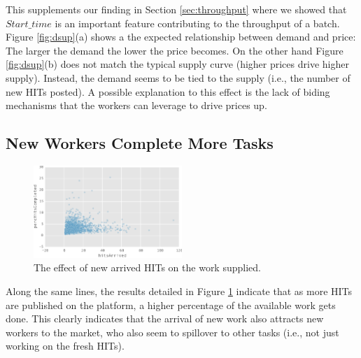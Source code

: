 This supplements our finding in Section \ref{sec:throughput} where we showed that $Start\_time$ is an important feature contributing to the throughput of a batch.
Figure \ref{fig:dsup}(a) shows a the expected relationship between demand and price: The larger the demand the lower the price becomes. On the other hand Figure \ref{fig:dsup}(b)  does not match the typical supply curve (higher prices drive higher supply). Instead, the demand seems to be tied to  the supply (i.e., the number of new HITs posted). A possible explanation to this effect is the lack of biding  mechanisms that the workers can leverage to drive prices up.

\subsection{New Workers Complete More Tasks}
\begin{figure}[tb]
	\centering
		\includegraphics[width=0.5\textwidth]{figures/percHitsCompleted}
	\caption{The effect of new arrived HITs on the work  supplied.}
	\label{fig:perc_hits_completed}
\end{figure}
Along the same lines, the results detailed in Figure \ref{fig:perc_hits_completed} indicate that as more HITs are published on the platform, a higher percentage of the available work gets done. 
This clearly indicates that the arrival of new work also attracts new workers
to the market, who also seem to spillover to other tasks (i.e., not just working on the fresh HITs).

